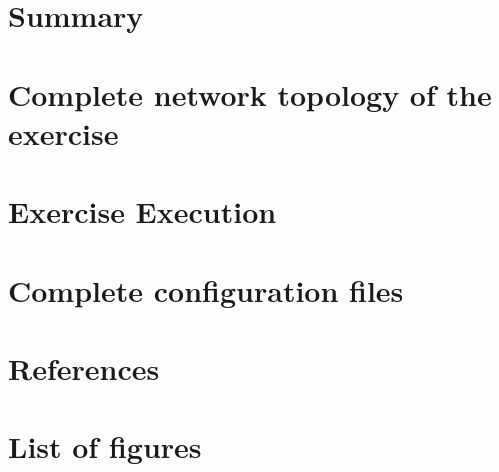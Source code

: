 \documentclass[a4paper]{article}
\begin{document}
\section{Summary}


\newpage

\section{Complete network topology of the exercise}

\newpage

\section{Exercise Execution}


\newpage
\section{Complete configuration files}
\begin{multicols}{2}
\end{multicols}
\newpage
\section{References}

\newpage
\section{List of figures}

\listoffigures
\end{document}
